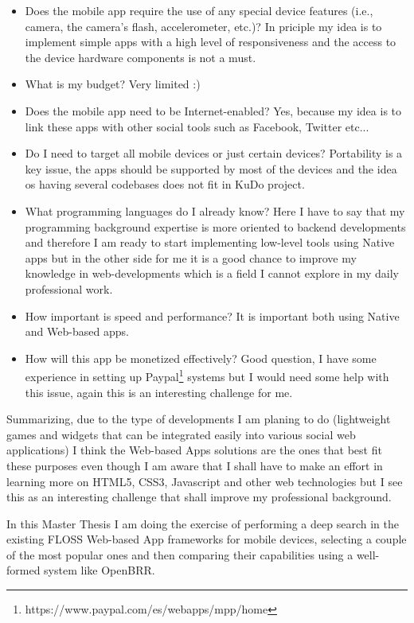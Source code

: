 \documentclass[a4paper,12pt]{book}
\begin{document}
\begin{itemize}
 \item Does the mobile app require the use of any special device features (i.e., camera, the camera’s flash, accelerometer, etc.)? In priciple my idea is to implement simple apps with a high level of responsiveness and the access to the device hardware components is not a must.
 \item What is my budget? Very limited :)
 \item Does the mobile app need to be Internet-enabled? Yes, because my idea is to link these apps with other social tools such as Facebook, Twitter etc...
 \item Do I need to target all mobile devices or just certain devices? Portability is a key issue, the apps should be supported by most of the devices and the idea os having several codebases does not fit in KuDo project.
 \item What programming languages do I already know? Here I have to say that my programming background expertise is more oriented to backend developments and therefore I am ready to start implementing low-level tools using Native apps but in the other side for me it is a good chance to improve my knowledge in web-developments which is a field I cannot explore in my daily professional work.
 \item How important is speed and performance? It is important both using Native and Web-based apps.
 \item How will this app be monetized effectively? Good question, I have some experience in setting up Paypal\footnote{https://www.paypal.com/es/webapps/mpp/home}  systems but I would need some help with this issue, again this is an interesting challenge for me.
\end{itemize}

Summarizing, due to the type of developments I am planing to do (lightweight games and widgets that can be integrated easily into various social web applications) I think the Web-based Apps solutions are the ones that best fit these purposes even though I am aware that I shall have to make an effort in learning more on HTML5, CSS3, Javascript and other web technologies but I see this as an interesting challenge that shall improve my professional background.

In this Master Thesis I am doing the exercise of performing a deep search in the existing FLOSS Web-based App frameworks for mobile devices, selecting a couple of the most popular ones and then comparing their capabilities using a well-formed system like OpenBRR.
\end{document}
